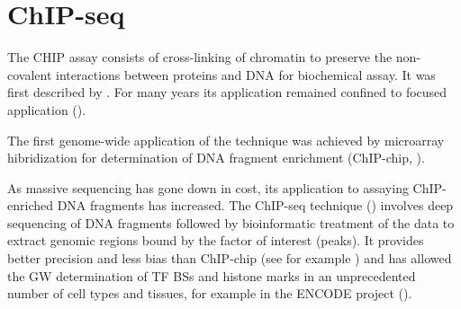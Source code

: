 
\section{ChIP-seq}


The \ac{CHIP} assay consists of cross-linking of chromatin to preserve the non-covalent interactions between proteins and DNA for biochemical assay. It was first described by \cite{Solomon1988}. For many years its application remained confined to focused application (\cite{Mardis2007}).  

The first genome-wide application of the technique was achieved by microarray hibridization for determination of DNA fragment enrichment (ChIP-chip, \cite{Ren2000}). 

As massive sequencing has gone down in cost, its application to assaying ChIP-enriched DNA fragments has increased. The ChIP-seq technique (\cite{Robertson2007}) involves deep sequencing of DNA fragments followed by bioinformatic treatment of the data to extract genomic regions bound by the factor of interest (peaks). It provides better precision and less bias than ChIP-chip (see for example \cite{Rhee2011}) and has allowed the \ac{GW} determination of \ac{TF} \acp{BS} and histone  marks in an unprecedented number of cell types and tissues, for example in the ENCODE project (\cite{2004, 2007, 2012}).



